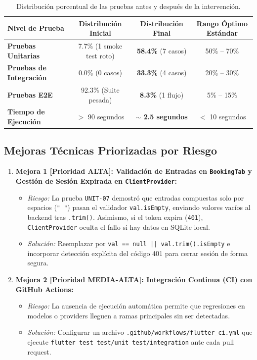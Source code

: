\documentclass[11pt,a4paper]{article}
\begin{document}
\begin{table}[htbp]
\centering
\small
\begin{tabularx}{\textwidth}{Xccc}
\toprule
\textbf{Nivel de Prueba} & \textbf{Distribución Inicial} & \textbf{Distribución Final} & \textbf{Rango Óptimo Estándar} \\
\midrule
\textbf{Pruebas Unitarias} & 7.7\% (1 smoke test roto) & \textbf{58.4\%} (7 casos) & 50\% -- 70\% \\
\textbf{Pruebas de Integración} & 0.0\% (0 casos) & \textbf{33.3\%} (4 casos) & 20\% -- 30\% \\
\textbf{Pruebas E2E} & 92.3\% (Suite pesada) & \textbf{8.3\%} (1 flujo) & 5\% -- 15\% \\
\midrule
\textbf{Tiempo de Ejecución} & $>$ 90 segundos & \textbf{$\sim$ 2.5 segundos} & $<$ 10 segundos \\
\bottomrule
\end{tabularx}
\caption{Distribución porcentual de las pruebas antes y después de la intervención.}
\label{tab:porcentajes_piramide}
\end{table}

\subsection{Mejoras Técnicas Priorizadas por Riesgo}

\begin{enumerate}
    \item \textbf{Mejora 1 [Prioridad ALTA]: Validación de Entradas en \texttt{BookingTab} y Gestión de Sesión Expirada en \texttt{ClientProvider}:}
    \begin{itemize}
        \item \textit{Riesgo:} La prueba \texttt{UNIT-07} demostró que entradas compuestas solo por espacios (\texttt{"   "}) pasan el validador \texttt{val.isEmpty}, enviando valores vacíos al backend tras \texttt{.trim()}. Asimismo, si el token expira (\texttt{401}), \texttt{ClientProvider} oculta el fallo si hay datos en SQLite local.
        \item \textit{Solución:} Reemplazar por \texttt{val == null || val.trim().isEmpty} e incorporar detección explícita del código 401 para cerrar sesión de forma segura.
    \end{itemize}
    \item \textbf{Mejora 2 [Prioridad MEDIA-ALTA]: Integración Continua (CI) con GitHub Actions:}
    \begin{itemize}
        \item \textit{Riesgo:} La ausencia de ejecución automática permite que regresiones en modelos o providers lleguen a ramas principales sin ser detectadas.
        \item \textit{Solución:} Configurar un archivo \texttt{.github/workflows/flutter\_ci.yml} que ejecute \texttt{flutter test test/unit test/integration} ante cada pull request.
    \end{itemize}
\end{enumerate}
\end{document}

